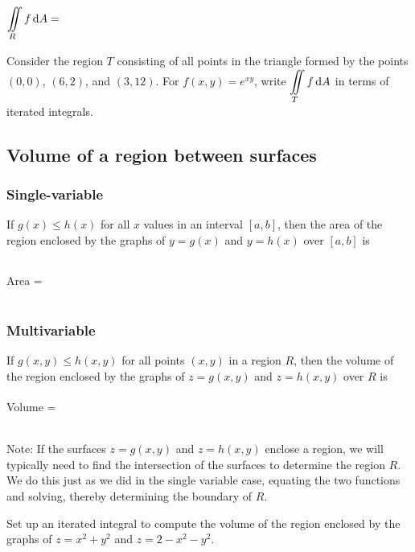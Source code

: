 $\displaystyle\iint\limits_R f\dA = \phantom{\iint\limits_{R_1}f\dA + \iint\limits_{R_2}f\dA.}$

\vspace{1in}

\begin{ex}
    Consider the region $T$ consisting of all points in the triangle formed by the points $(0,0)$, $(6,2)$, and $(3,12)$.  For $f(x,y)=e^{xy}$, write $\displaystyle\iint\limits_T f\mathop{}\!\mathrm{d} A$ in terms of iterated integrals.
\end{ex}

\pagebreak 

\subsection{Volume of a region between surfaces}
\subsubsection{Single-variable}
If $g(x)\le h(x)$ for all $x$ values in an interval $[a,b]$, then the area of the region enclosed by the graphs of $y=g(x)$ and $y=h(x)$ over $[a,b]$ is \\ 
\smallskip 

\noindent Area = $\phantom{\displaystyle\int\limits_a^b \left(h(x)-g(x)\right)\dx.}$
\vspace{.5in}

\subsubsection{Multivariable}
If $g(x,y)\le h(x,y)$ for all points $(x,y)$ in a region $R$, then the volume of the region enclosed by the graphs of $z=g(x,y)$ and $z=h(x,y)$ over $R$ is \\
\smallskip 

\noindent Volume = $\phantom{\displaystyle\iint\limits_R\left(h(x,y)-g(x,y)\right)\dA}$
\vspace{1in}

Note: If the surfaces $z=g(x,y)$ and $z=h(x,y)$ enclose a region, we will typically need to find the intersection of the surfaces to determine the region $R$. We do this just as we did in the single variable case, equating the two functions and solving, thereby determining the boundary of $R$.
\begin{ex}
    Set up an iterated integral to compute the volume of the region enclosed by the graphs of $z=x^2+y^2$ and $z=2-x^2-y^2$.
\end{ex}

